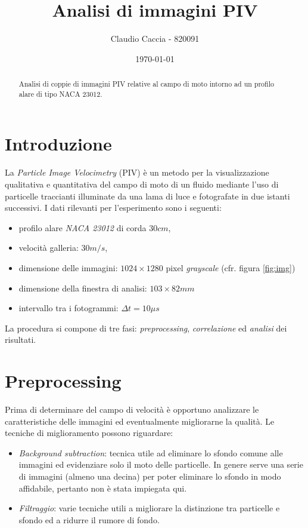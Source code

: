 \documentclass[a4paper]{article}
\title{Analisi di immagini PIV}
\author{Claudio Caccia - 820091}
\date{\today}
\begin{document}
\maketitle

\begin{abstract}
Analisi di coppie di immagini PIV relative al campo di moto intorno ad un profilo alare di tipo NACA 23012. 
\end{abstract}

\section{Introduzione}
\label{sec:intro}

La \textit{Particle Image Velocimetry} (PIV) è un metodo per la visualizzazione qualitativa e quantitativa del campo di moto di un fluido mediante l'uso di particelle traccianti illuminate da una lama di luce e fotografate in due istanti successivi. I dati rilevanti per l'esperimento sono i seguenti:
\begin{itemize}
	\item profilo alare \textit{NACA 23012} di corda $30cm$,
	\item velocità galleria: $30m/s$,
	\item dimensione delle immagini: $1024 \times 1280$ pixel \textit{grayscale} (cfr. figura \ref{fig:img}) 
	\item dimensione della finestra di analisi: $103\times82mm$
	\item intervallo tra i fotogrammi: $\Delta t = 10\mu s$
\end{itemize}

La procedura si compone di tre fasi: \textit{preprocessing}, \textit{correlazione} ed \textit{analisi} dei risultati.

\section{Preprocessing}

Prima di determinare del campo di velocità è opportuno analizzare le caratteristiche delle immagini ed eventualmente migliorarne la qualità. Le tecniche di miglioramento possono riguardare:

\begin{itemize}
	\item \textit{Background subtraction}: tecnica utile ad eliminare lo sfondo comune alle immagini ed evidenziare solo il moto delle particelle. In genere serve una serie di immagini (almeno una decina) per poter eliminare lo sfondo in modo affidabile, pertanto non è stata impiegata qui.
	\item \textit{Filtraggio}:  varie tecniche utili a migliorare la distinzione tra particelle e sfondo ed a ridurre il rumore di fondo.
\end{itemize}
\end{document}

